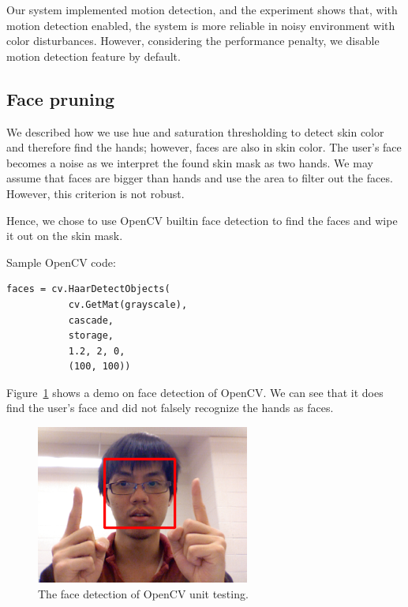 \documentclass[10pt,twocolumn,letterpaper]{article}
\begin{document}
Our system implemented motion detection, and 
the experiment shows that, with motion detection enabled, 
the system is more reliable in noisy environment with color 
disturbances. However, considering the performance penalty, we 
disable motion detection feature by default.

\subsection{Face pruning}
\label{sec:face}
We described how we use hue and saturation thresholding to detect skin
 color and therefore find the hands; however, faces are also in skin color. 
 The user's face becomes a noise as we interpret the found skin mask as 
 two hands. We may assume that faces are bigger than hands and use 
 the area to filter out the faces. However, this criterion is not robust. 

 Hence, we chose to use OpenCV builtin face detection to find the faces 
 and wipe it out on the skin mask.

Sample OpenCV code:
 \begin{verbatim}
faces = cv.HaarDetectObjects(
           cv.GetMat(grayscale), 
           cascade, 
           storage, 
           1.2, 2, 0, 
           (100, 100))
 \end{verbatim}

Figure~\ref{fig:facedetect} shows a demo on face detection of OpenCV. 
We can see that it does find the user's face and did not 
falsely recognize the hands as faces.

 \begin{figure}[h]
 \centering
 \includegraphics[width=7cm]{facedetection.png}
 \caption{The face detection of OpenCV unit testing. }
 \label{fig:facedetect}
 \end{figure}
\end{document}
